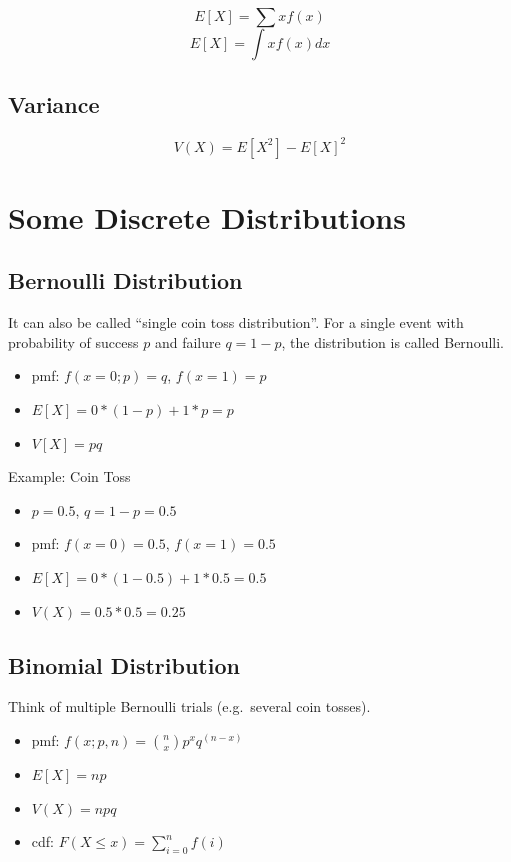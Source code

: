 \documentclass[]{book}
\theoremstyle{definition}
\theoremstyle{definition}
\theoremstyle{definition}
\theoremstyle{remark}
\begin{document}
\[E[X] = \sum x f(x)\] \[E[X] = \int x f(x) dx\]

\hypertarget{variance}{%
\section{Variance}\label{variance}}

\[V(X) = E[X^2] - E[X]^2 \]

\hypertarget{some-discrete-distributions}{%
\chapter{Some Discrete
Distributions}\label{some-discrete-distributions}}

\hypertarget{bernoulli-distribution}{%
\section{Bernoulli Distribution}\label{bernoulli-distribution}}

It can also be called ``single coin toss distribution''. For a single
event with probability of success \(p\) and failure \(q = 1 - p\), the
distribution is called Bernoulli.

\begin{itemize}
\item
  pmf: \(f(x = 0;p) = q\), \(f(x = 1) = p\)
\item
  \(E[X] = 0*(1-p) + 1*p = p\)
\item
  \(V[X] = pq\)
\end{itemize}

Example: Coin Toss

\begin{itemize}
\item
  \(p = 0.5\), \(q = 1 - p = 0.5\)
\item
  pmf: \(f(x = 0) = 0.5\), \(f(x = 1) = 0.5\)
\item
  \(E[X] = 0*(1-0.5) + 1*0.5 = 0.5\)
\item
  \(V(X) = 0.5*0.5 = 0.25\)
\end{itemize}

\hypertarget{binomial-distribution}{%
\section{Binomial Distribution}\label{binomial-distribution}}

Think of multiple Bernoulli trials (e.g.~several coin tosses).

\begin{itemize}
\item
  pmf: \(f(x;p,n) = \binom{n}{x} p^xq^{(n-x)}\)
\item
  \(E[X] = np\)
\item
  \(V(X) = npq\)
\item
  cdf: \(F(X \le x) = \sum_{i=0}^n f(i)\)
\end{itemize}
\end{document}
